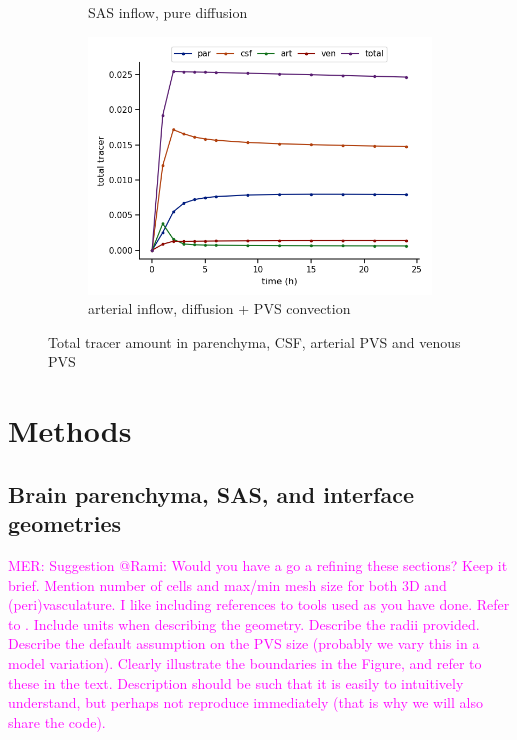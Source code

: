 \documentclass[fleqn,10pt]{wlscirep}
\newcommand{\mer}[1]{\textcolor{magenta}{#1}}
\begin{document}
\begin{figure}
\begin{subfigure}[b]{0.33\textwidth}
         \caption{SAS inflow, pure diffusion}
         \label{fig:three sin x}
     \end{subfigure}
     \hfill
     \begin{subfigure}[b]{0.33\textwidth}
         \centering
         \includegraphics[width=\textwidth]{modelC_total_conc.png}
         \caption{arterial inflow, diffusion + PVS convection}
         \label{fig:five over x}
     \end{subfigure}
        \caption{Total tracer amount in parenchyma, CSF, arterial PVS and venous PVS}
        \label{fig:three graphs}
\end{figure}

\fi

\newpage
\section*{Methods}


\subsection*{Brain parenchyma, SAS, and interface geometries}

\mer{MER: Suggestion @Rami: Would you have a go a refining these sections? Keep it brief. Mention number of cells and max/min mesh size for both 3D and (peri)vasculature. I like including references to tools used as you have done. Refer to \Cref{fig:concept}. Include units when describing the geometry. Describe the radii provided. Describe the default assumption on the PVS size (probably we vary this in a model variation). Clearly illustrate the boundaries in the Figure, and refer to these in the text. Description should be such that it is easily to intuitively understand, but perhaps not reproduce immediately (that is why we will also share the code). }  
\end{document}
